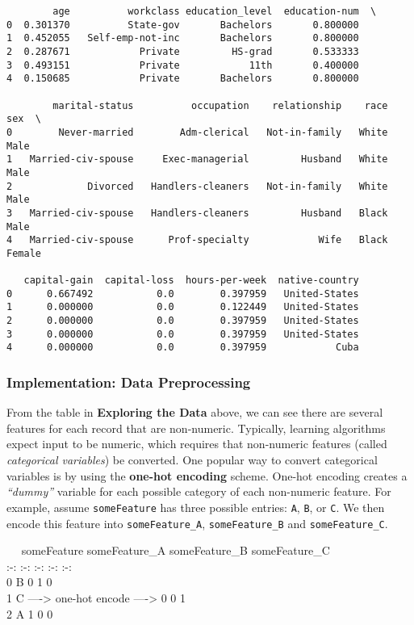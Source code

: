 \documentclass[11pt]{article}
\begin{document}
    
    \begin{verbatim}
        age          workclass education_level  education-num  \
0  0.301370          State-gov       Bachelors       0.800000   
1  0.452055   Self-emp-not-inc       Bachelors       0.800000   
2  0.287671            Private         HS-grad       0.533333   
3  0.493151            Private            11th       0.400000   
4  0.150685            Private       Bachelors       0.800000   

        marital-status          occupation    relationship    race      sex  \
0        Never-married        Adm-clerical   Not-in-family   White     Male   
1   Married-civ-spouse     Exec-managerial         Husband   White     Male   
2             Divorced   Handlers-cleaners   Not-in-family   White     Male   
3   Married-civ-spouse   Handlers-cleaners         Husband   Black     Male   
4   Married-civ-spouse      Prof-specialty            Wife   Black   Female   

   capital-gain  capital-loss  hours-per-week  native-country  
0      0.667492           0.0        0.397959   United-States  
1      0.000000           0.0        0.122449   United-States  
2      0.000000           0.0        0.397959   United-States  
3      0.000000           0.0        0.397959   United-States  
4      0.000000           0.0        0.397959            Cuba  
    \end{verbatim}

    
    \hypertarget{implementation-data-preprocessing}{%
\subsubsection{Implementation: Data
Preprocessing}\label{implementation-data-preprocessing}}

From the table in \textbf{Exploring the Data} above, we can see there
are several features for each record that are non-numeric. Typically,
learning algorithms expect input to be numeric, which requires that
non-numeric features (called \emph{categorical variables}) be converted.
One popular way to convert categorical variables is by using the
\textbf{one-hot encoding} scheme. One-hot encoding creates a
\emph{``dummy''} variable for each possible category of each non-numeric
feature. For example, assume \texttt{someFeature} has three possible
entries: \texttt{A}, \texttt{B}, or \texttt{C}. We then encode this
feature into \texttt{someFeature\_A}, \texttt{someFeature\_B} and
\texttt{someFeature\_C}.

~~\textbar{} someFeature \textbar{} \textbar{} someFeature\_A \textbar{}
someFeature\_B \textbar{} someFeature\_C \textbar{}\\
:-: \textbar{} :-: \textbar{} \textbar{} :-: \textbar{} :-: \textbar{}
:-: \textbar{}\\
0 \textbar{} B \textbar{} \textbar{} 0 \textbar{} 1 \textbar{} 0
\textbar{}\\
1 \textbar{} C \textbar{} ----\textgreater{} one-hot encode
----\textgreater{} \textbar{} 0 \textbar{} 0 \textbar{} 1 \textbar{}\\
2 \textbar{} A \textbar{} \textbar{} 1 \textbar{} 0 \textbar{} 0
\textbar{}
\end{document}
